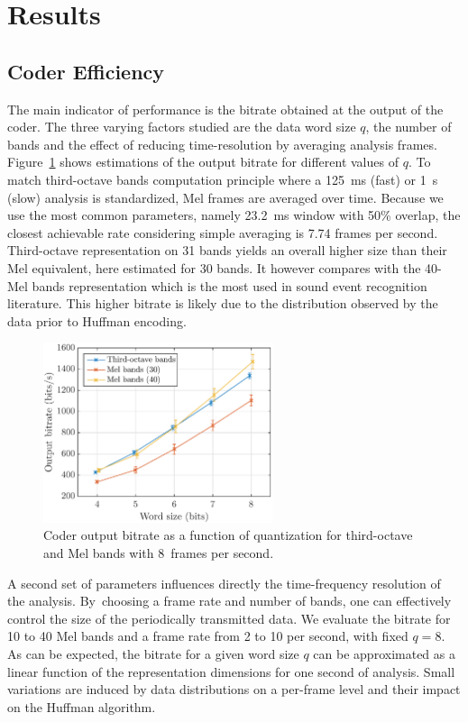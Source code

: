 \documentclass[sensors,article,accept,moreauthors,pdftex,10pt,a4paper]{mdpi}
\begin{document}
\section{Results} \label{sec:results}
\vspace{-6pt}

\subsection{Coder Efficiency} \label{sec:efficiency_r}

The main indicator of performance is the bitrate obtained at the output of the coder. The three varying factors studied are the data word size $q$, the number of bands and the effect of reducing time-resolution by averaging analysis frames. Figure~\ref{fig:bitrate_q} shows estimations of the output bitrate for different values of $q$. To match third-octave bands computation principle where a 125~ms (fast) or 1~s (slow) analysis is standardized, Mel frames are averaged over time. Because we use the most common parameters, namely 23.2~ms window with 50\% overlap, the closest achievable rate considering simple averaging is 7.74 frames per second. Third-octave representation on 31 bands yields an overall higher size than their Mel equivalent, here estimated for 30 bands. It however compares with the 40-Mel bands representation which is the most used in sound event recognition literature. This higher bitrate is likely due to the distribution observed by the data prior to Huffman encoding.

\begin{figure}[H]
	\centering
		\includegraphics[width=0.6\textwidth]{figures/bitrate_qall.eps}
	\caption{Coder output bitrate as a function of quantization for third-octave and Mel bands with 8~frames per second.}
	\label{fig:bitrate_q}
\end{figure}

A second set of parameters influences directly the time-frequency resolution of the analysis. By~choosing a frame rate and number of bands, one can effectively control the size of the periodically transmitted data. We evaluate the bitrate for 10 to 40 Mel bands and a frame rate from 2 to 10 per second, with fixed $q = 8$. As can be expected, the bitrate for a given word size $q$ can be approximated as a linear function of the representation dimensions for one second of analysis. Small variations are induced by data distributions on a per-frame level and their impact on the Huffman algorithm.
\end{document}
